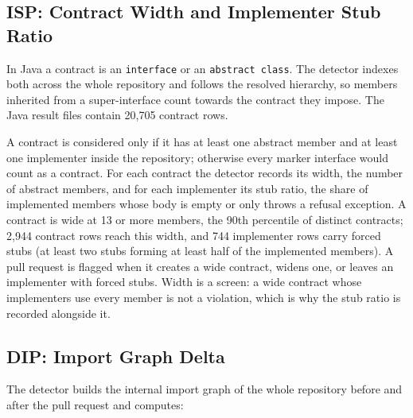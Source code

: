 \subsection{ISP: Contract Width and Implementer Stub Ratio}

In Java a contract is an \texttt{interface} or an \texttt{abstract class}. The detector indexes both
across the whole repository and follows the resolved hierarchy, so members inherited from a
super-interface count towards the contract they impose. The Java result files contain 20{,}705
contract rows.

A contract is considered only if it has at least one abstract member and at least one implementer
inside the repository; otherwise every marker interface would count as a contract. For each contract
the detector records its width, the number of abstract members, and for each implementer its stub
ratio, the share of implemented members whose body is empty or only throws a refusal exception. A
contract is wide at 13 or more members, the 90th percentile of distinct contracts; 2{,}944 contract
rows reach this width, and 744 implementer rows carry forced stubs (at least two stubs forming at
least half of the implemented members). A pull request is flagged when it creates a wide contract,
widens one, or leaves an implementer with forced stubs. Width is a screen: a wide contract whose
implementers use every member is not a violation, which is why the stub ratio is recorded alongside
it.

\subsection{DIP: Import Graph Delta}

The detector builds the internal import graph of the whole repository before and after the pull
request and computes:

